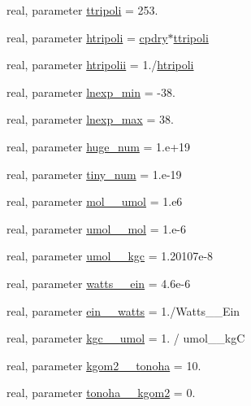 \begin{DoxyCompactItemize}
\item 
real, parameter \hyperlink{namespaceconsts__coms_a7a8253ab1b6ed9a65304dcabc61587dd}{ttripoli} = 253.
\item 
real, parameter \hyperlink{namespaceconsts__coms_a823cf4f0ac3ad6922988b3dd8cb809d2}{htripoli} = \hyperlink{namespaceconsts__coms_a1d31bf978b711e0b276c563e2bed88f0}{cpdry}$\ast$\hyperlink{namespaceconsts__coms_a7a8253ab1b6ed9a65304dcabc61587dd}{ttripoli}
\item 
real, parameter \hyperlink{namespaceconsts__coms_a5d4d8f013ab8c773c7a3c4417e67af03}{htripolii} = 1./\hyperlink{namespaceconsts__coms_a823cf4f0ac3ad6922988b3dd8cb809d2}{htripoli}
\item 
real, parameter \hyperlink{namespaceconsts__coms_a7593d016f6b5a649ea21585de53834f0}{lnexp\+\_\+min} = -\/38.
\item 
real, parameter \hyperlink{namespaceconsts__coms_aeb257212c54fabf595d8fb81170ef1d8}{lnexp\+\_\+max} = 38.
\item 
real, parameter \hyperlink{namespaceconsts__coms_a6a5c10fb375429bb6cbc12bb37617f31}{huge\+\_\+num} = 1.e+19
\item 
real, parameter \hyperlink{namespaceconsts__coms_a9dc9f1b4f076c19c09ba1adb961cddc3}{tiny\+\_\+num} = 1.e-\/19
\item 
real, parameter \hyperlink{namespaceconsts__coms_a68d9924e4ce2e95d25b3c4862bf895d8}{mol\+\_\+\_\+umol} = 1.e6
\item 
real, parameter \hyperlink{namespaceconsts__coms_aba28d1403d413d9d638ca1bf165cdd7a}{umol\+\_\+\_\+mol} = 1.e-\/6
\item 
real, parameter \hyperlink{namespaceconsts__coms_a756eff7bd58f33114bdbf059ce2c6726}{umol\+\_\+\_\+kgc} = 1.\+20107e-\/8
\item 
real, parameter \hyperlink{namespaceconsts__coms_aa14064c869d9c4d8d2b81b03e660b7d0}{watts\+\_\+\_\+ein} = 4.\+6e-\/6
\item 
real, parameter \hyperlink{namespaceconsts__coms_a6eb4fb188bbbc09a5b24e1ffa57e03aa}{ein\+\_\+\_\+watts} = 1./Watts\+\_\+\_\+\+Ein
\item 
real, parameter \hyperlink{namespaceconsts__coms_ac17190e203b566b6be141ddcd8344ae9}{kgc\+\_\+\_\+umol} = 1. / umol\+\_\+\_\+kgC
\item 
real, parameter \hyperlink{namespaceconsts__coms_a2061fb811f5d7c9f856e62b48d85c10c}{kgom2\+\_\+\_\+tonoha} = 10.
\item 
real, parameter \hyperlink{namespaceconsts__coms_aa7675ead7f9ba61cbdd5778d0cf09f95}{tonoha\+\_\+\_\+kgom2} = 0.

\end{DoxyCompactItemize}
